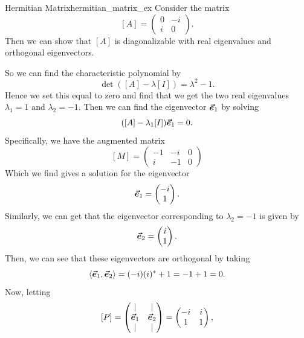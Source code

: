             \begin{ex}{Hermitian Matrix}{hermitian_matrix_ex}
                Consider the matrix
                \[
                [A]=\begin{pmatrix} 0 & -i \\ i & 0 \end{pmatrix}.
                \]
                Then we can show that $[A]$ is diagonalizable with real eigenvalues and orthogonal eigenvectors.  
                
                So we can find the characteristic polynomial by
                \[
                \det([A]-\lambda [I])=\lambda^2 - 1.
                \]
                Hence we set this equal to zero and find that we get the two real eigenvalues $\lambda_1=1$ and $\lambda_2=-1$.  Then we can find the eigenvector $\boldsymbol{\vec{e}}_1$ by solving
                \[
                ([A]-\lambda_1 [I])\boldsymbol{\vec{e}}_1 = 0.
                \]
                Specifically, we have the augmented matrix
                \[
                [M] = \left( \begin{array}{cc|c}
                    -1 & -i & 0 \\
                    i & -1 & 0
                \end{array}\right)
                \]
                Which we find gives a solution for the eigenvector 
                \[
                \boldsymbol{\vec{e}}_1 = \begin{pmatrix} -i \\ 1\end{pmatrix}.
                \]
                Similarly, we can get that the eigenvector corresponding to $\lambda_2=-1$ is given by 
                \[
                \boldsymbol{\vec{e}}_2=\begin{pmatrix} i \\ 1 \end{pmatrix}.
                \]
                Then, we can see that these eigenvectors are orthogonal by taking
                \[
                \langle \boldsymbol{\vec{e}}_1,\boldsymbol{\vec{e}}_2 \rangle = (-i)(i)^* + 1 = -1+1 = 0.
                \]
                Now, letting
                \[
                [P]=\begin{pmatrix} \vert & \vert \\ \boldsymbol{\vec{e}}_1 & \boldsymbol{\vec{e}}_2 \\ \vert & \vert \end{pmatrix} = \begin{pmatrix} -i & i \\ 1 & 1 \end{pmatrix}, 
\]
\end{ex}
